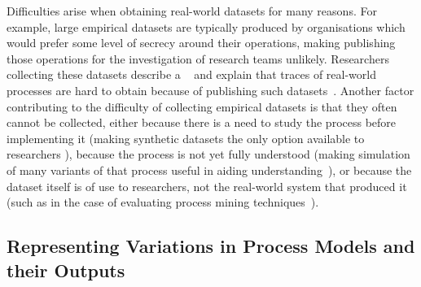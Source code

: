 Difficulties arise when obtaining real-world datasets for many reasons. For
example, large empirical datasets are typically produced by organisations which
would prefer some level of secrecy around their operations, making publishing
those operations for the investigation of research teams unlikely. Researchers
collecting these datasets describe a ~\cite{bpi_ten_years_of_datasets} and explain that traces of real-world
processes are hard to obtain because  of publishing such
datasets~\cite{bpi_ten_years_of_datasets}. Another factor contributing to the
difficulty of collecting empirical datasets is that they often cannot be
collected, either because there is a need to study the process before
implementing it (making synthetic datasets the only option available to
researchers ), because
the process is not yet fully understood (making simulation of many variants of
that process useful in aiding understanding~), or because the dataset itself
is of use to researchers, not the real-world system that produced it (such as in
the case of evaluating process mining
techniques~\cite{van2004process,agrawal1998mining}). ~ 

\subsection{Representing Variations in Process Models and their Outputs}\label{subsec:variations_in_sm}

